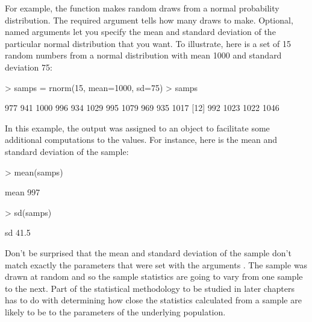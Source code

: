 For example, the  function makes random draws from a
normal probability distribution.  The required argument tells how many
draws to make.  Optional, named arguments let you specify the mean and
standard deviation of the particular normal distribution that you
want.  To illustrate, here is a set of 15 random numbers from a normal
distribution with mean 1000 and standard deviation 75:
\begin{Schunk}
\begin{Sinput}
> samps = rnorm(15, mean=1000, sd=75)
> samps
\end{Sinput}
\begin{Soutput}
 [1]  977  941 1000  996  934 1029  995 1079  969  935 1017
[12]  992 1023 1022 1046
\end{Soutput}
\end{Schunk}
In this example, the output was assigned to an object 
to facilitate some additional computations to the
values.  For instance, here is the mean and standard deviation of the
sample:
\begin{Schunk}
\begin{Sinput}
> mean(samps)
\end{Sinput}
\begin{Soutput}
mean 
 997 
\end{Soutput}
\begin{Sinput}
> sd(samps)
\end{Sinput}
\begin{Soutput}
  sd 
41.5 
\end{Soutput}
\end{Schunk}
Don't be surprised that the mean and standard deviation of the sample
don't match exactly the parameters that were set with the arguments
.  The sample was drawn at random and so the
sample statistics are going to vary from one sample to the next.  Part
of the statistical methodology to be studied in later chapters has to
do with determining how close the statistics calculated from a sample
are likely to be to the parameters of the underlying population.

